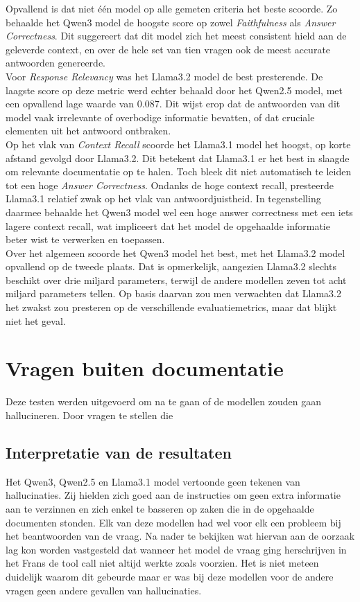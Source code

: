 Opvallend is dat niet één model op alle gemeten criteria het beste scoorde. Zo behaalde het Qwen3 model de hoogste score op zowel \textit{Faithfulness} als \textit{Answer Correctness}. Dit suggereert dat dit model zich het meest consistent hield aan de geleverde context, en over de hele set van tien vragen ook de meest accurate antwoorden genereerde.
\\[1em]
Voor \textit{Response Relevancy} was het Llama3.2 model de best presterende. De laagste score op deze metric werd echter behaald door het Qwen2.5 model, met een opvallend lage waarde van 0.087. Dit wijst erop dat de antwoorden van dit model vaak irrelevante of overbodige informatie bevatten, of dat cruciale elementen uit het antwoord ontbraken.
\\[1em]
Op het vlak van \textit{Context Recall} scoorde het Llama3.1 model het hoogst, op korte afstand gevolgd door Llama3.2. Dit betekent dat Llama3.1 er het best in slaagde om relevante documentatie op te halen. Toch bleek dit niet automatisch te leiden tot een hoge \textit{Answer Correctness}. Ondanks de hoge context recall, presteerde Llama3.1 relatief zwak op het vlak van antwoordjuistheid. In tegenstelling daarmee behaalde het Qwen3 model wel een hoge answer correctness met een iets lagere context recall, wat impliceert dat het model de opgehaalde informatie beter wist te verwerken en toepassen.
\\[1em]
Over het algemeen scoorde het Qwen3 model het best, met het Llama3.2 model opvallend op de tweede plaats. Dat is opmerkelijk, aangezien Llama3.2 slechts beschikt over drie miljard parameters, terwijl de andere modellen zeven tot acht miljard parameters tellen. Op basis daarvan zou men verwachten dat Llama3.2 het zwakst zou presteren op de verschillende evaluatiemetrics, maar dat blijkt niet het geval.

\section{Vragen buiten documentatie}
Deze testen werden uitgevoerd om na te gaan of de modellen zouden gaan hallucineren. Door vragen te stellen die 

\subsection{Interpretatie van de resultaten}

Het Qwen3, Qwen2.5 en Llama3.1 model vertoonde geen tekenen van hallucinaties. Zij hielden zich goed aan de instructies om geen extra informatie aan te verzinnen en zich enkel te basseren op zaken die in de opgehaalde documenten stonden. Elk van deze modellen had wel voor elk een probleem bij het beantwoorden van de vraag. Na nader te bekijken wat hiervan aan de oorzaak lag kon worden vastgesteld dat wanneer het model de vraag ging herschrijven in het Frans de tool call niet altijd werkte zoals voorzien. Het is niet meteen duidelijk waarom dit gebeurde maar er was bij deze modellen voor de andere vragen geen andere gevallen van hallucinaties.


